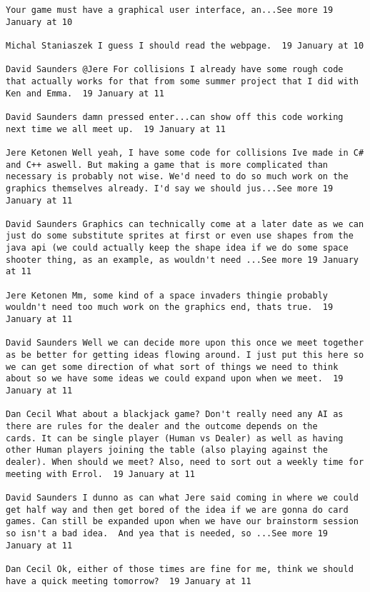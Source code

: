 \begin{verbatim}
Your game must have a graphical user interface, an...See more 19
January at 10

Michal Staniaszek I guess I should read the webpage.  19 January at 10

David Saunders ‎@Jere For collisions I already have some rough code
that actually works for that from some summer project that I did with
Ken and Emma.  19 January at 11

David Saunders damn pressed enter...can show off this code working
next time we all meet up.  19 January at 11

Jere Ketonen Well yeah, I have some code for collisions Ive made in C#
and C++ aswell. But making a game that is more complicated than
necessary is probably not wise. We'd need to do so much work on the
graphics themselves already. I'd say we should jus...See more 19
January at 11

David Saunders Graphics can technically come at a later date as we can
just do some substitute sprites at first or even use shapes from the
java api (we could actually keep the shape idea if we do some space
shooter thing, as an example, as wouldn't need ...See more 19 January
at 11

Jere Ketonen Mm, some kind of a space invaders thingie probably
wouldn't need too much work on the graphics end, thats true.  19
January at 11

David Saunders Well we can decide more upon this once we meet together
as be better for getting ideas flowing around. I just put this here so
we can get some direction of what sort of things we need to think
about so we have some ideas we could expand upon when we meet.  19
January at 11

Dan Cecil What about a blackjack game? Don't really need any AI as
there are rules for the dealer and the outcome depends on the
cards. It can be single player (Human vs Dealer) as well as having
other Human players joining the table (also playing against the
dealer). When should we meet? Also, need to sort out a weekly time for
meeting with Errol.  19 January at 11

David Saunders I dunno as can what Jere said coming in where we could
get half way and then get bored of the idea if we are gonna do card
games. Can still be expanded upon when we have our brainstorm session
so isn't a bad idea.  And yea that is needed, so ...See more 19
January at 11

Dan Cecil Ok, either of those times are fine for me, think we should
have a quick meeting tomorrow?  19 January at 11


\end{verbatim}
